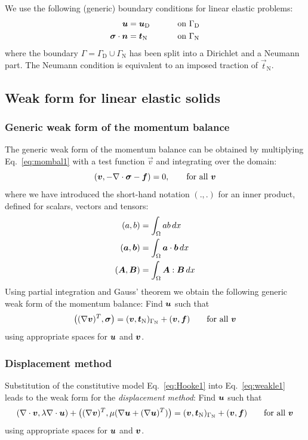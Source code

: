 We use the following (generic) boundary conditions for linear elastic problems:
\begin{alignat}{2}
    \boldsymbol{u} &= \boldsymbol{u}_\text{D}\qquad&&\text{ on }\Gamma_\text{D}\\
    \boldsymbol{\sigma}\cdot\boldsymbol{n}&=\boldsymbol{t}_{\text{N}} &&\text{ on }\Gamma_{\text{N}}
\end{alignat}
where the boundary $\Gamma=\Gamma_\text{D}\cup\Gamma_{\text{N}}$ has been split into a
Dirichlet and a Neumann part. The Neumann condition is equivalent
to an imposed traction of $\vec t_{\text{N}}$.

\subsection{Weak form for linear elastic solids}
\label{sec:linear_elastic_weak}
\subsubsection{Generic weak form of the momentum balance}
The generic weak form of the momentum balance can be obtained by multiplying
Eq.~\eqref{eq:mombal1} with a test function $\vec v$ and integrating over the domain:
\begin{equation}
  (\boldsymbol{v},-\nabla\cdot\boldsymbol{\sigma} -\boldsymbol{f})=0,\qquad\text{for all }\boldsymbol{v}
\end{equation}
where we have introduced the short-hand notation $(.,.)$ for an inner product, defined for scalars, vectors and tensors:
\begin{align*}
   (a,b)&=\int_\Omega a b\,d x\\
   (\boldsymbol{a}, \boldsymbol{b})&=\int_\Omega\boldsymbol{a}\cdot\boldsymbol{b}\,d x\\
   (\boldsymbol{A}, \boldsymbol{B})&=\int_\Omega\boldsymbol{A}:\boldsymbol{B}\,d x
\end{align*}
Using partial integration and Gauss'
theorem we obtain the following generic weak form of the momentum balance: 
Find $\boldsymbol{u}$ such that
\begin{equation}
  \big((\nabla\boldsymbol{v})^T,\boldsymbol{\sigma}\big)=(\boldsymbol{v},\boldsymbol{t}_{\text{N}})_{\Gamma_{\text{N}}}+(\boldsymbol{v},\boldsymbol{f})
\qquad\text{for all }\boldsymbol{v}\label{eq:weakle1}
\end{equation}
using appropriate spaces for $\boldsymbol{u}$ and $\boldsymbol{v}$.

\subsubsection{Displacement method}
Substitution of the constitutive model Eq.~\eqref{eq:Hooke1} into Eq.~\eqref{eq:weakle1} leads to the weak form for the \emph{displacement method}: Find $\boldsymbol{u}$ such that
\begin{equation}
  (\nabla\cdot\boldsymbol{v},\lambda\nabla\cdot\boldsymbol{u})+\big((\nabla\boldsymbol{v})^T,\mu(\nabla\boldsymbol{u}+(\nabla\boldsymbol{u})^T)\big)=(\boldsymbol{v},\boldsymbol{t}_{\text{N}})_{\Gamma_{\text{N}}}+(\boldsymbol{v},\boldsymbol{f})
\qquad\text{for all }\boldsymbol{v}\label{eq:weakle2}
\end{equation}
using appropriate spaces for $\boldsymbol{u}$ and $\boldsymbol{v}$.

